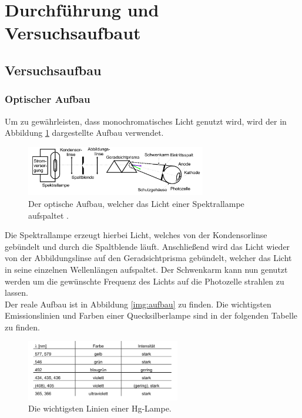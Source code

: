 \newpage
\section{Durchführung und Versuchsaufbaut}



 \subsection{Versuchsaufbau}

    \subsubsection{Optischer Aufbau}

    \noindent Um zu gewährleisten, dass monochromatisches Licht genutzt wird, wird der in Abbildung \ref{img:linse} dargestellte Aufbau verwendet.


    \begin{figure}[H]
        \centering
        \includegraphics[width=0.7\textwidth]{latex/images/Optiken.PNG}
        \caption{Der optische Aufbau, welcher das Licht einer Spektrallampe aufspaltet  \protect \cite{500}.}
        \label{img:linse}
    \end{figure}

    \noindent Die Spektrallampe erzeugt hierbei Licht, welches von der Kondensorlinse gebündelt und durch die Spaltblende läuft.
    Anschließend wird das Licht wieder von der Abbildungslinse auf den Geradsichtprisma gebündelt, welcher das Licht in seine einzelnen Wellenlängen aufspaltet.
    Der Schwenkarm kann nun genutzt werden um die gewünschte Frequenz des Lichts auf die Photozelle strahlen zu lassen.\\
    Der reale Aufbau ist in Abbildung \ref{img:aufbau} zu finden.
    Die wichtigsten Emissionslinien und Farben einer Quecksilberlampe sind in der folgenden Tabelle zu finden.

    \begin{figure}[H]
        \centering
        \includegraphics[width=0.6\textwidth]{latex/images/Hg.PNG}
        \caption{Die wichtigsten Linien einer Hg-Lampe\protect \cite{500}.}
        \label{img:Hg}
    \end{figure}

